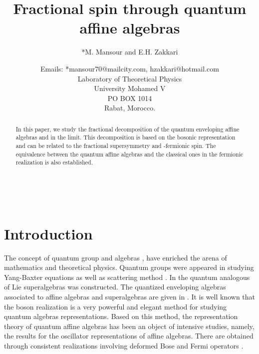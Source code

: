 \documentclass[a4paper,12pt,thmsa]{article}
\begin{document}
\title{Fractional spin through quantum affine algebras }
\author{*M. Mansour and \myHighlight{$\bullet $}\coordHE{}E.H. Zakkari \and Emails: *mansour70@mailcity.com,
\myHighlight{$\bullet $}\coordHE{}hzakkari@hotmail.com \\
Laboratory of Theoretical Physics\\
University Mohamed V\\
PO BOX 1014\\
Rabat, Morocco.}
\date{}
\maketitle

\begin{abstract}
In this paper, we study the fractional decomposition of the quantum
enveloping affine algebras \coordHE{} and \coordHE{} in the
\coordHE{} limit. This decomposition is based on the
bosonic representation and can be related to the fractional supersymmetry
and \coordHE{}-fermionic spin. The equivalence between the quantum affine algebras
and the classical ones in the fermionic realization is also established.
\end{abstract}

\newpage\

\section{Introduction}

The concept of quantum group and algebras \myHighlight{$[1,2]$}\coordHE{}, have enriched the arena
of mathematics and theoretical physics. Quantum groups were appeared in
studying Yang-Baxter equations \myHighlight{$[3]$}\coordHE{} as well as scattering method \myHighlight{$[4]$}\coordHE{}. In \myHighlight{$%
[5,6]$}\coordHE{} the quantum analogous of Lie superalgebras was constructed. The
quantized enveloping algebras associated to affine algebras and
superalgebras are given in \myHighlight{$[1,7]$}\coordHE{}. It is well known that the boson
realization is a very powerful and elegant method for studying quantum
algebras representations. Based on this method, the representation theory of
quantum affine algebras has been an object of intensive studies, namely, the
results for the oscillator representations of affine algebras. There are
obtained \myHighlight{$[8-10]$}\coordHE{} through consistent realizations involving deformed Bose
and Fermi operators \myHighlight{$[11,12]$}\coordHE{}.
\end{document}
